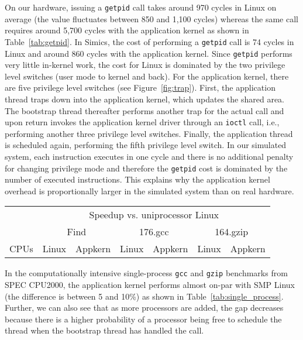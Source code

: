 \label{fix:lmbench}On our hardware, issuing a \texttt{getpid} call takes
around 970 cycles in Linux on average (the value fluctuates between 850 and
1,100 cycles) whereas the same call requires around 5,700 cycles with the
application kernel as shown in Table~\ref{tab:getpid}.  In Simics, the cost of
performing a \texttt{getpid} call is 74 cycles in Linux and around 860 cycles
with the application kernel. Since \texttt{getpid} performs very little
in-kernel work, the cost for Linux is dominated by the two privilege level
switches (user mode to kernel and back). For the application kernel, there are
five privilege level switches (see Figure~\ref{fig:trap}). First, the
application thread traps down into the application kernel, which updates the
shared area. The bootstrap thread thereafter performs another trap for the
actual call and upon return invokes the application kernel driver through an
\texttt{ioctl} call, i.e., performing another three privilege level switches.
Finally, the application thread is scheduled again, performing the fifth
privilege level switch. In our simulated system, each instruction executes in
one cycle and there is no additional penalty for changing privilege mode and
therefore the \texttt{getpid} cost is dominated by the number of executed
instructions.  This explains why the application kernel overhead is
proportionally larger in the simulated system than on real hardware.

\begin{table*}
  \caption[Single-process speedup]{Speedup for the single-process benchmarks.}
  \begin{center}
    \label{tab:single_process}
    \begin{footnotesize}
      \begin{tabular}{r|rr|rr|rr}
        \hline
        & \multicolumn{6}{c}{Speedup vs. uniprocessor Linux} \\
        & \multicolumn{2}{c}{Find} & \multicolumn{2}{c}{176.gcc} & \multicolumn{2}{c}{164.gzip} \\
        CPUs & Linux & Appkern  & Linux & Appkern  & Linux & Appkern \\
        \hline
        
        \hline
      \end{tabular}
    \end{footnotesize}
  \end{center}
\end{table*}

In the computationally intensive single-process \texttt{gcc} and \texttt{gzip}
benchmarks from SPEC CPU2000, the application kernel performs almost on-par
with SMP Linux (the difference is between 5 and 10\%) as shown in
Table~\ref{tab:single_process}.  Further, we can also see that as more
processors are added, the gap decreases because there is a higher probability
of a processor being free to schedule the thread when the bootstrap thread has
handled the call.

